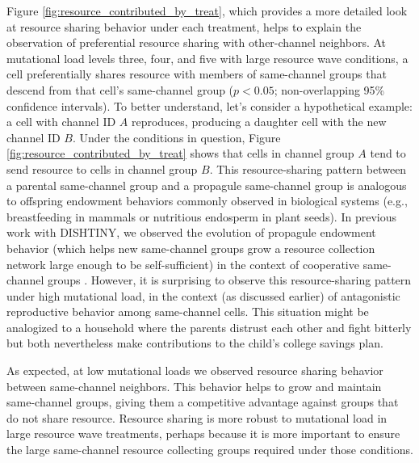 Figure \ref{fig:resource_contributed_by_treat}, which provides a more detailed look at resource sharing behavior under each treatment, helps to explain the observation of preferential resource sharing with other-channel neighbors.
At mutational load levels three, four, and five with large resource wave conditions, a cell preferentially shares resource with members of same-channel groups that descend from that cell's same-channel group ($p < 0.05$; non-overlapping 95\% confidence intervals).
To better understand, let's consider a hypothetical example: a cell with channel ID $A$ reproduces, producing a daughter cell with the new channel ID $B$.
Under the conditions in question, Figure \ref{fig:resource_contributed_by_treat} shows that cells in channel group $A$ tend to send resource to cells in channel group $B$.
This resource-sharing pattern between a parental same-channel group and a propagule same-channel group is analogous to offspring endowment behaviors commonly observed in biological systems (e.g., breastfeeding in mammals or nutritious endosperm in plant seeds).
In previous work with DISHTINY, we observed the evolution of propagule endowment behavior (which helps new same-channel groups grow a resource collection network large enough to be self-sufficient) in the context of cooperative same-channel groups \citep{moreno2018toward}.
However, it is surprising to observe this resource-sharing pattern under high mutational load, in the context (as discussed earlier) of antagonistic reproductive behavior among same-channel cells.
This situation might be analogized to a household where the parents distrust each other and fight bitterly but both nevertheless make contributions to the child's college savings plan.

As expected, at low mutational loads we observed resource sharing behavior between same-channel neighbors.
This behavior helps to grow and maintain same-channel groups, giving them a competitive advantage against groups that do not share resource.
Resource sharing is more robust to mutational load in large resource wave treatments, perhaps because it is more important to ensure the large same-channel resource collecting groups required under those conditions.



